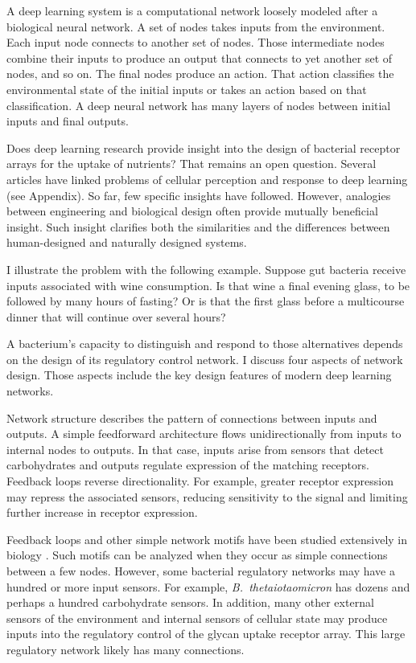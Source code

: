 \documentclass[\mydocfontsize]{article}
\begin{document}
\begin{multicols}{2}
A deep learning system is a computational network loosely modeled after a biological neural network. A set of nodes takes inputs from the environment. Each input node connects to another set of nodes. Those intermediate nodes combine their inputs to produce an output that connects to yet another set of nodes, and so on. The final nodes produce an action. That action classifies the environmental state of the initial inputs or takes an action based on that classification. A deep neural network has many layers of nodes between initial inputs and final outputs. 

Does deep learning research provide insight into the design of bacterial receptor arrays for the uptake of nutrients? That remains an open question. Several articles have linked problems of cellular perception and response to deep learning (see Appendix). So far, few specific insights have followed. However, analogies between engineering and biological design often provide mutually beneficial insight. Such insight clarifies both the similarities and the differences between human-designed and naturally designed systems.  

I illustrate the problem with the following example. Suppose gut bacteria receive inputs associated with wine consumption. Is that wine a final evening glass, to be followed by many hours of fasting? Or is that the first glass before a multicourse dinner that will continue over several hours? 

A bacterium's capacity to distinguish and respond to those alternatives depends on the design of its regulatory control network. I discuss four aspects of network design. Those aspects include the key design features of modern deep learning networks.

 Network structure describes the pattern of connections between inputs and outputs. A simple feedforward architecture flows unidirectionally from inputs to internal nodes to outputs. In that case, inputs arise from sensors that detect carbohydrates and outputs regulate expression of the matching receptors. Feedback loops reverse directionality. For example, greater receptor expression may repress the associated sensors, reducing sensitivity to the signal and limiting further increase in receptor expression. 

Feedback loops and other simple network motifs have been studied extensively in biology \autocite{alon07network}. Such motifs can be analyzed when they occur as simple connections between a few nodes. However, some bacterial regulatory networks may have a hundred or more input sensors. For example, \textit{B.\ thetaiotaomicron} has dozens and perhaps a hundred carbohydrate sensors. In addition, many other external sensors of the environment and internal sensors of cellular state may produce inputs into the regulatory control of the glycan uptake receptor array. This large regulatory network likely has many connections. 


\end{multicols}
\end{document}

